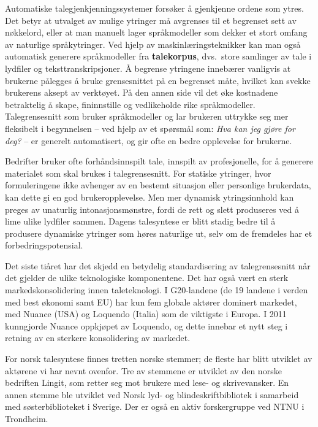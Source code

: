 \begin{multicols}{2}
Automatiske talegjenkjenningssystemer forsøker å gjenkjenne ordene som ytres. Det betyr at utvalget av mulige ytringer må avgrenses til et begrenset sett av nøkkelord, eller at man manuelt lager språkmodeller som dekker et stort omfang av naturlige språkytringer. Ved hjelp av maskinlæringsteknikker kan man også automatisk generere språkmodeller fra \textbf{talekorpus}, dvs.~store samlinger av tale i lydfiler og teksttranskripsjoner. Å begrense ytringene innebærer vanligvis at brukerne pålegges å bruke grensesnittet på en begrenset måte, hvilket kan svekke brukerens aksept av verktøyet. På den annen side vil det øke kostnadene betraktelig å skape, fininnstille og vedlikeholde rike språkmodeller. Talegrensesnitt som bruker språkmodeller og lar brukeren uttrykke seg mer fleksibelt i begynnelsen – ved hjelp av et spørsmål som: \textit{Hva kan jeg gjøre for deg?} – er generelt automatisert, og gir ofte en bedre opplevelse for brukerne. 


Bedrifter bruker ofte forhåndsinnspilt tale, innspilt av  profesjonelle, for å generere materialet som skal brukes i talegrensesnitt. For statiske ytringer, hvor formuleringene ikke avhenger av en bestemt situasjon eller personlige brukerdata, kan dette gi en god brukeropplevelse. Men mer dynamisk ytringsinnhold kan preges av unaturlig intonasjonsmønstre, fordi de rett og slett produseres ved å lime ulike lydfiler sammen. Dagens talesyntese er blitt stadig bedre til å produsere dynamiske ytringer som høres naturlige ut, selv om de fremdeles har et forbedringspotensial. 

Det siste tiåret har det skjedd en betydelig standardisering av talegrensesnitt når det gjelder de ulike teknologiske komponentene. Det har  også vært en sterk markedskonsolidering innen taleteknologi. I G20-landene (de 19 landene i verden med best økonomi samt EU) har kun fem globale aktører dominert markedet, med Nuance (USA) og Loquendo (Italia) som de viktigste i Europa. I 2011 kunngjorde Nuance oppkjøpet av Loquendo, og dette innebar et nytt steg i retning av en sterkere konsolidering av markedet. 

For norsk talesyntese finnes tretten norske stemmer; de fleste har blitt utviklet av aktørene vi har nevnt ovenfor. 
Tre av stemmene er utviklet av den norske bedriften Lingit, som retter seg mot brukere med lese- og skrivevansker. 
En annen stemme ble utviklet ved Norsk lyd- og blindeskriftbibliotek i samarbeid med søsterbiblioteket i Sverige. 
Der er også en aktiv forskergruppe ved NTNU i Trondheim.


\end{multicols}
